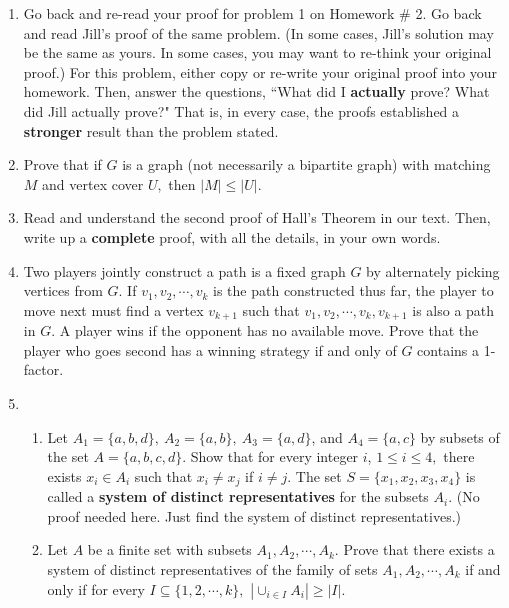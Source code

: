 \documentclass[12pt]{article}
\renewcommand{\emph}[1]{\textsf{\textbf{#1}}}
\begin{document}
\begin{enumerate}
\item Go back and re-read your proof for problem 1 on Homework \# 2. Go back and read Jill's proof of the same problem. (In some cases, Jill's solution may be the same as yours. In some cases, you may want to re-think your original proof.) For this problem, either copy or re-write your original proof into your homework. Then, answer the questions, ``What did I \emph{actually} prove? What did Jill actually prove?" That is, in every case, the proofs established a \emph{stronger} result than the problem stated.

\item Prove that if $G$ is a graph (not necessarily a bipartite graph) with matching $M$ and vertex cover $U,$ then $|M|\leq |U|.$

\item Read and understand the second proof of Hall's Theorem in our text. Then, write up a \emph{complete} proof, with all the details, in your own words. 

\item Two players jointly construct a path is a fixed graph $G$ by alternately picking vertices from $G$. If $v_1,v_2,\cdots, v_k$ is the path constructed thus far, the player to move next must find a vertex $v_{k+1}$ such that $v_1,v_2,\cdots, v_k, v_{k+1}$ is also a path in $G.$ A player wins if the opponent has no available move. Prove that the player who goes second has a winning strategy if and only of $G$ contains a 1-factor.

\item 
	\begin{enumerate}
	\item Let $A_1 =\{a,b,d\},\: A_2=\{a,b\}, \: A_3=\{a,d\}$, and $A_4=\{a,c\}$ by subsets of the set $A=\{a,b,c,d\}.$ Show that for every integer $i$, $1 \leq i \leq 4,$ there exists $x_i \in A_i$ such that $x_i \not = x_j$ if $i \not = j.$ The set $S=\{x_1,x_2,x_3,x_4\}$ is called a \emph{system of distinct representatives} for the subsets $A_i.$ (No proof needed here. Just find the system of distinct representatives.)
	\item Let $A$ be a finite set with subsets $A_1, A_2, \cdots, A_k.$ Prove that there exists a system of distinct representatives of the family of sets $A_1, A_2, \cdots, A_k$ if and only if for every $I\subseteq\{1,2,\cdots,k\},$ $\displaystyle{\left\vert \cup_{i \in I} A_i\right\vert \geq | I|.}$
	\end{enumerate}
	

\end{enumerate}
\end{document}
